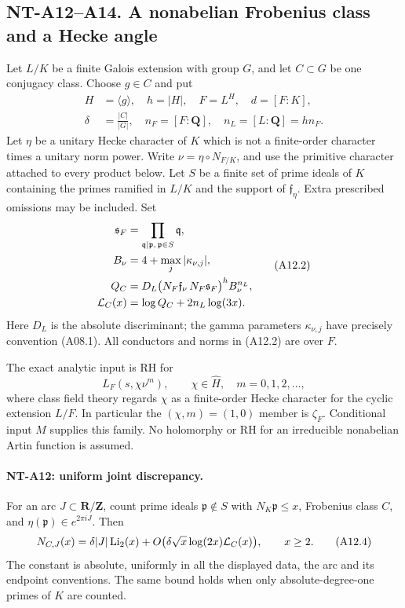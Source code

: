 \subsection*{NT-A12--A14. A nonabelian Frobenius class and a Hecke angle}

Let \(L/K\) be a finite Galois extension with group \(G\), and let
\(C\subset G\) be one conjugacy class. Choose \(g\in C\) and put
\[
 \begin{aligned}
 H&=\langle g\rangle,\quad h=|H|,\quad F=L^H,\quad d=[F:K],\\
 \delta&=\frac{|C|}{|G|},\quad n_F=[F:\mathbf Q],\quad
                              n_L=[L:\mathbf Q]=h n_F .
 \end{aligned}
                                                               \tag{A12.1}
\]
Let \(\eta\) be a unitary Hecke character of \(K\) which is not a
finite-order character times a unitary norm power. Write
\(\nu=\eta\circ N_{F/K}\), and use the primitive character attached
to every product below. Let \(S\) be a finite set of prime ideals of
\(K\) containing the primes ramified in \(L/K\) and the support of
\(\mathfrak f_\eta\). Extra prescribed omissions may be included.
Set
\[
 \begin{aligned}
 \mathfrak s_F&=\prod_{\mathfrak q\mid\mathfrak p,\,
                                      \mathfrak p\in S}\mathfrak q,\\
 B_\nu&=4+\max_j|\kappa_{\nu,j}|,\\
 Q_C&=D_L
       \bigl(N_F\mathfrak f_\nu\,N_F\mathfrak s_F\bigr)^h
       B_\nu^{n_L},\\
 {\cal L}_C(x)&=\log Q_C+2n_L\log(3x).
 \end{aligned}                                                 \tag{A12.2}
\]
Here \(D_L\) is the absolute discriminant; the gamma parameters
\(\kappa_{\nu,j}\) have precisely convention (A08.1).
All conductors and norms in (A12.2) are over \(F\).

The exact analytic input is RH for
\[
 L_F(s,\chi\nu^m),\qquad
       \chi\in\widehat H,\quad m=0,1,2,\ldots,                 \tag{A12.3}
\]
where class field theory regards \(\chi\) as a finite-order Hecke
character for the cyclic extension \(L/F\). In particular the
\((\chi,m)=(1,0)\) member is \(\zeta_F\).
Conditional input \(M\) supplies this family. No holomorphy or RH
for an irreducible nonabelian Artin function is assumed.

\paragraph{NT-A12: uniform joint discrepancy.}
For an arc \(J\subset\mathbf R/\mathbf Z\), count prime ideals
\(\mathfrak p\notin S\) with \(N_K\mathfrak p\le x\),
Frobenius class \(C\), and \(\eta(\mathfrak p)\in e^{2\pi iJ}\).
Then
\[
 N_{C,J}(x)
   =\delta |J|\operatorname{Li}_2(x)
      +O\bigl(\delta\sqrt x\log(2x){\cal L}_C(x)\bigr),
       \qquad x\ge2.                                      \tag{A12.4}
\]
The constant is absolute, uniformly in all the displayed data,
the arc and its endpoint conventions. The same bound holds when
only absolute-degree-one primes of \(K\) are counted.

